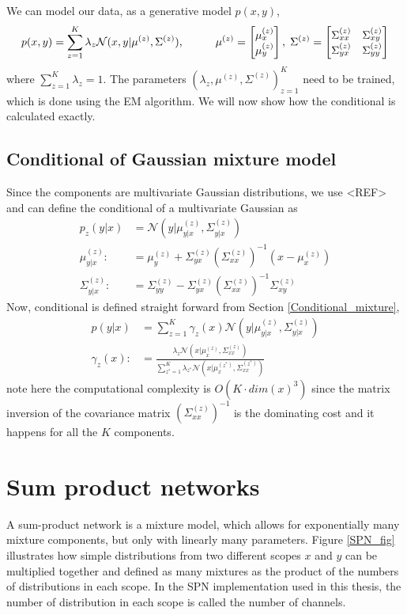 We can model our data, as a generative model $p(x,y)$, 
$$p(x,y)= \sum_{z=1}^K \lambda_z \mathcal{N}(x,y|\mu^{(z)},\Sigma^{(z)}), \hspace{1cm}
\mu^{(z)}=\begin{bmatrix} \mu^{(z)}_x \\ \mu^{(z)}_y \end{bmatrix},\hspace{0.1cm} \Sigma^{(z)} =
\begin{bmatrix} \Sigma^{(z)}_{xx} & \Sigma^{(z)}_{xy}\\ \Sigma^{(z)}_{yx}& \Sigma^{(z)}_{yy}
\end{bmatrix}$$ where $\sum_{z=1}^K \lambda_z = 1$. The parameters $\left(\lambda_z,
\mu^{(z)}, \Sigma^{(z)} \right)_{z=1}^K$ need to be trained, which is done using the EM
algorithm. We will now show how the conditional is calculated exactly. 

\subsection{Conditional of Gaussian mixture model}
Since the components are multivariate Gaussian distributions, we use <REF> and can define the
conditional of a multivariate Gaussian as
\begin{align}
    p_z(y|x) &= \mathcal{N}(y|\mu^{(z)}_{y|x},\Sigma^{(z)}_{y|x} )\\
    \mu^{(z)}_{y|x} :&= \mu^{(z)}_y+\Sigma^{(z)}_{yx}(\Sigma^{(z)}_{xx})^{-1}(x-\mu^{(z)}_x)\\
    \Sigma^{(z)}_{y|x} :&= \Sigma^{(z)}_{yy}-\Sigma^{(z)}_{yx}(\Sigma^{(z)}_{xx})^{-1}\Sigma^{(z)}_{xy} 
\end{align}
Now, conditional is defined straight forward from Section \eqref{Conditional_mixture},
\begin{align}
    p(y|x) &= \sum_{z=1}^K \gamma_z(x) \mathcal{N}(y|\mu_{y|x}^{(z)},\Sigma_{y|x}^{(z)} ) \\
    \gamma_z(x) :&=\frac{\lambda_z \mathcal{N}(x|\mu_{x}^{(z)},\Sigma_{xx}^{(z)})}{\sum_{z^*=1}^K \lambda_{z^*}
\mathcal{N}(x|\mu_{x}^{(z^*)},\Sigma_{xx}^{(z^*)})}
\end{align}
note here the computational complexity is $O(K\cdot dim(x)^3)$ since the matrix inversion
of the covariance matrix $(\Sigma^{(z)}_{xx})^{-1}$ is the dominating cost and it happens
for all the $K$ components. 

\section{Sum product networks}
A sum-product network is a mixture model, which allows for exponentially many mixture components,
but only with linearly many parameters. Figure \ref{SPN_fig} illustrates how simple distributions
from two different scopes $x$ and $y$ can be multiplied together and defined as many mixtures as the
product of the numbers of distributions in each scope. In the SPN implementation used in this
thesis, the number of distribution in each scope is called the number of channels.  

